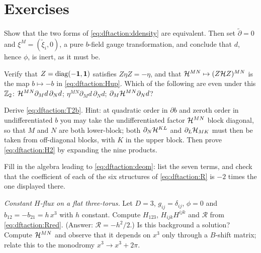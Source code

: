 \section*{Exercises}

\begin{exercise}[$\star$]
Show that the two forms of \eqref{eq:dftaction:ddensity} are equivalent. Then set
$\tilde\partial=0$ and $\xi^M=(\tilde\xi_i,0)$, a pure $b$-field gauge transformation, and
conclude that $d$, hence $\phi$, is inert, as it must be.
\end{exercise}

\begin{exercise}[$\star$]
Verify that $Z=\operatorname{diag}(-\mathbf 1,\mathbf 1)$ satisfies $Z\eta Z=-\eta$, and that
$\mathcal{H}^{MN}\mapsto(Z\mathcal{H} Z)^{MN}$ is the map $b\mapsto-b$ in \eqref{eq:dftaction:Hup}. Which of the
following are even under this $\mathbb{Z}_2$: $\mathcal{H}^{MN}\partial_Md\,\partial_Nd$;
$\eta^{MN}\partial_Md\,\partial_Nd$; $\partial_M\mathcal{H}^{MN}\partial_Nd$?
\end{exercise}

\begin{exercise}[$\star\star$]\label{ex:dftaction:T2b}
Derive \eqref{eq:dftaction:T2b}. Hint: at quadratic order in $\partial b$ and zeroth order in
undifferentiated $b$ you may take the undifferentiated factor $\mathcal{H}^{MN}$ block diagonal, so
that $M$ and $N$ are both lower-block; both $\partial_N\mathcal{H}^{KL}$ and $\partial_L\mathcal{H}_{MK}$ must then
be taken from off-diagonal blocks, with $K$ in the upper block.
Then prove \eqref{eq:dftaction:H2} by expanding the nine products.
\end{exercise}

\begin{exercise}[$\star\star$]
Fill in the algebra leading to \eqref{eq:dftaction:deom}: list the seven terms, and check that
the coefficient of each of the six structures of \eqref{eq:dftaction:R} is $-2$ times the one
displayed there.
\end{exercise}

\begin{exercise}[$\star\star$] \emph{Constant $H$-flux on a flat three-torus.}
Let $D=3$, $g_{ij}=\delta_{ij}$, $\phi=0$ and $b_{12}=-b_{21}=h\,x^3$ with $h$ constant. Compute
$H_{123}$, $H_{ijk}H^{ijk}$ and $\mathcal R$ from \eqref{eq:dftaction:Rred}. (Answer:
$\mathcal R=-h^2/2$.) Is this background a solution? Compute $\mathcal{H}^{MN}$ and observe that it depends
on $x^3$ only through a $B$-shift matrix; relate this to the monodromy $x^3\to x^3+2\pi$.
\end{exercise}

